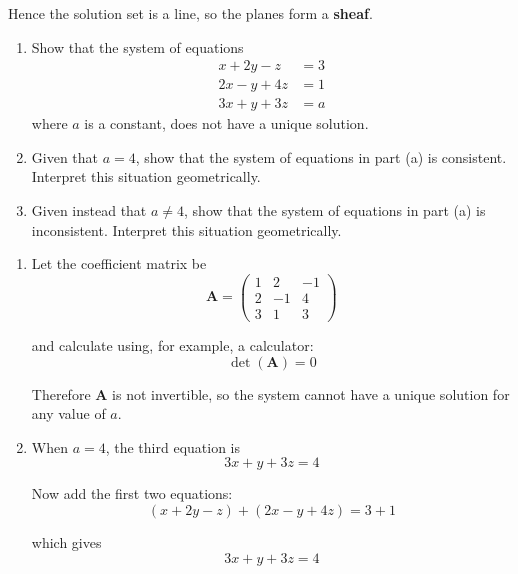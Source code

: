 \documentclass[leqno]{article}
\begin{document}
\begin{enumerate}[
  label=\textbf{\arabic*.},
  leftmargin=*,
  topsep=0pt,
  partopsep=0pt,
  parsep=0pt
]
\begin{djsSolution}
\begin{enumerate}[label=\textbf{(\alph*)}]
Hence the solution set is a line, so the planes form a \textbf{sheaf}.
\end{enumerate}
\end{djsSolution}


\newpage

\questionitem

\begin{enumerate}[label=\textbf{(\alph*)}]
  \item Show that the system of equations
  \[
  \begin{aligned}
  x+2y-z&=3\\
  2x-y+4z&=1\\
  3x+y+3z&=a
  \end{aligned}
  \]
  where $a$ is a constant, does not have a unique solution. \\
  \item Given that $a=4$, show that the system of equations in part (a) is consistent. Interpret this situation geometrically.  \\
  \item Given instead that $a\ne 4$, show that the system of equations in part (a) is inconsistent. Interpret this situation geometrically.  \\
\end{enumerate}

\vspace*{10pt}

\begin{djsSolution}
\begin{enumerate}[label=\textbf{(\alph*)}]
  \item Let the coefficient matrix be
\[
\mathbf{A}=\begin{pmatrix}
1&2&-1\\
2&-1&4\\
3&1&3
\end{pmatrix}
\]

and calculate using, for example, a calculator:
\[
\det(\mathbf{A})=0
\]

Therefore $\mathbf{A}$ is not invertible, so the system cannot have a unique solution for any value of $a$.

  \item When $a=4$, the third equation is
\[
3x+y+3z=4
\]

Now add the first two equations:
\[
(x+2y-z)+(2x-y+4z)=3+1
\]

which gives
\[
3x+y+3z=4
\]


\end{enumerate}
\end{djsSolution}
\end{enumerate}
\end{document}
